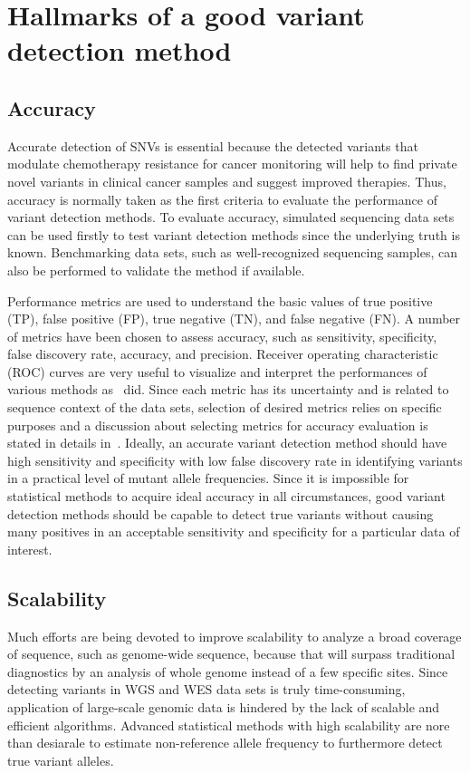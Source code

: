 \documentclass[a4,center,fleqn]{NAR}
\begin{document}
\section{Hallmarks of a good variant detection method}

\subsection{Accuracy}
Accurate detection of SNVs is essential because the detected variants that modulate chemotherapy resistance for cancer monitoring will help to find private novel variants in clinical cancer samples and suggest improved therapies.
Thus, accuracy is normally taken as the first criteria to evaluate the performance of variant detection methods.
To evaluate accuracy, simulated sequencing data sets can be used firstly to test variant detection methods since the underlying truth is known.
Benchmarking data sets, such as well-recognized sequencing samples, can also be performed to validate the method if available.

Performance metrics are used to understand the basic values of true positive (TP), false positive (FP), true negative (TN), and false negative (FN).
A number of metrics have been chosen to assess accuracy, such as sensitivity, specificity, false discovery rate, accuracy, and precision.
Receiver operating characteristic (ROC) curves are very useful to visualize and interpret the performances of various methods as~\citep{Xu2014, Huang2015, He2015} did.
Since each metric has its uncertainty and is related to sequence context of the data sets, selection of desired metrics relies on specific purposes and a discussion about selecting metrics for accuracy evaluation is stated in details in~\citep{Olson2015}.
Ideally, an accurate variant detection method should have high sensitivity and specificity with low false discovery rate in identifying variants in a practical level of mutant allele frequencies.
Since it is impossible for statistical methods to acquire ideal accuracy in all circumstances, good variant detection methods should be capable to detect true variants without causing many positives in an acceptable sensitivity and specificity for a particular data of interest.


\subsection{Scalability}

Much efforts are being devoted to improve scalability to analyze a broad coverage of sequence, such as genome-wide sequence, because that will surpass traditional diagnostics by an analysis of whole genome instead of a few specific sites.
Since detecting variants in WGS and WES data sets is truly time-consuming, application of large-scale genomic data is hindered by the lack of scalable and efficient algorithms.
Advanced statistical methods with high scalability are nore than desiarale to estimate non-reference allele frequency to furthermore detect true variant alleles.
\end{document}
